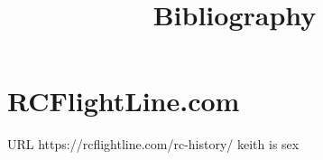 \documentclass{article}
\title{Bibliography}
\begin{document}
\section{RCFlightLine.com}
	URL https://rcflightline.com/rc-history/
	keith is sex
\end{document}
